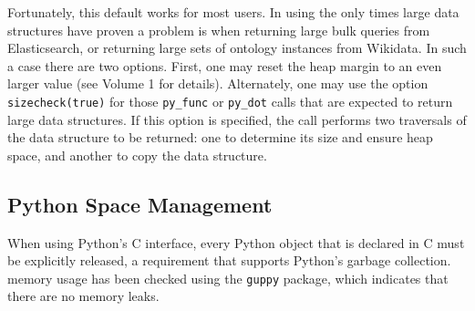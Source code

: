 Fortunately, this default works for most users.  In using \janus{}
the only times large data structures have proven a problem is when
returning large bulk queries from Elasticsearch, or returning large
sets of ontology instances from Wikidata.  In such a case there are
two options.  First, one may reset the heap margin to an even larger
value (see Volume 1 for details).  Alternately, one may use the option
{\tt sizecheck(true)} for those {\tt py\_func} or {\tt py\_dot} calls that
are expected to return large data structures.  If this option is
specified, the call performs two traversals of the data structure to
be returned: one to determine its size and ensure heap space, and another
to copy the data structure.

\subsection{Python Space Management}

When using Python's C interface, every Python object that is declared
in C must be explicitly released, a requirement that supports Python's
garbage collection.  \janus{} memory usage has been checked using
the {\tt guppy} package, which indicates that there are no memory
leaks.

%
